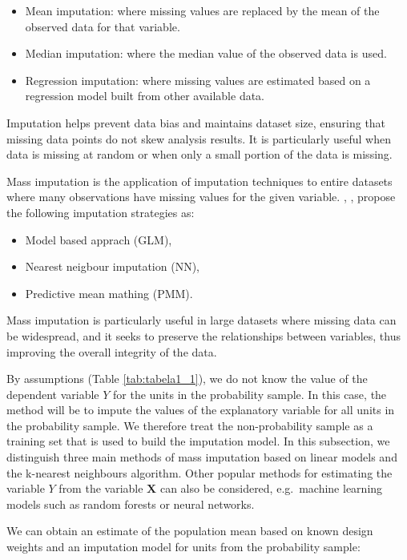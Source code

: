 \documentclass[
]{jss}
\begin{document}
\begin{itemize}
    \item Mean imputation: where missing values are replaced by the mean of the observed data for that variable.
    \item Median imputation: where the median value of the observed data is used.
    \item Regression imputation: where missing values are estimated based on a regression model built from other available data.
\end{itemize}

Imputation helps prevent data bias and maintains dataset size, ensuring
that missing data points do not skew analysis results. It is
particularly useful when data is missing at random or when only a small
portion of the data is missing.

Mass imputation is the application of imputation techniques to entire
datasets where many observations have missing values for the given
variable. \citet{kim_combining_2021}, \citet{yang2021integration},
\citet{Beres} propose the following imputation strategies as:

\begin{itemize}
    \item Model based apprach (GLM),
    \item Nearest neigbour imputation (NN),
    \item Predictive mean mathing (PMM).
\end{itemize}

Mass imputation is particularly useful in large datasets where missing
data can be widespread, and it seeks to preserve the relationships
between variables, thus improving the overall integrity of the data.

By assumptions (Table \ref{tab:tabela1_1}), we do not know the value of
the dependent variable \(Y\) for the units in the probability sample. In
this case, the method will be to impute the values of the explanatory
variable for all units in the probability sample. We therefore treat the
non-probability sample as a training set that is used to build the
imputation model. In this subsection, we distinguish three main methods
of mass imputation based on linear models and the k-nearest neighbours
algorithm. Other popular methods for estimating the variable \(Y\) from
the variable \(\boldsymbol{X}\) can also be considered, e.g.~machine
learning models such as random forests or neural networks.

We can obtain an estimate of the population mean based on known design
weights and an imputation model for units from the probability sample:
\end{document}
